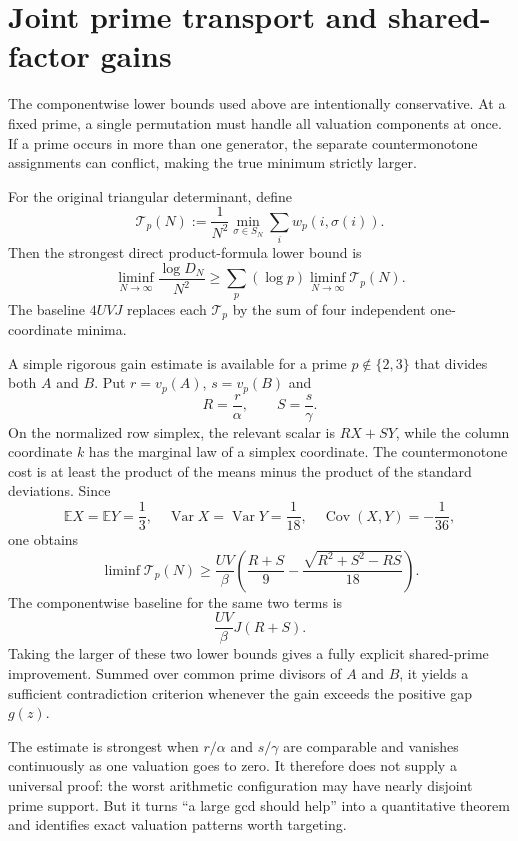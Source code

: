 \documentclass[11pt,oneside]{article}
\theoremstyle{definition}
\theoremstyle{remark}
\newcommand{\E}{\mathbb E}
\newcommand{\Var}{\operatorname{Var}}
\newcommand{\Cov}{\operatorname{Cov}}
\begin{document}
\section{Joint prime transport and shared-factor gains}

The componentwise lower bounds used above are intentionally conservative.  At
a fixed prime, a single permutation must handle all valuation components at
once.  If a prime occurs in more than one generator, the separate
countermonotone assignments can conflict, making the true minimum strictly
larger.

For the original triangular determinant, define
\[
 \mathcal T_p(N):=\frac1{N^2}
 \min_{\sigma\in S_N}\sum_i w_p(i,\sigma(i)).
\]
Then the strongest direct product-formula lower bound is
\[
 \liminf_{N\to\infty}\frac{\log D_N}{N^2}
 \ge\sum_p(\log p)\liminf_{N\to\infty}\mathcal T_p(N).
\]
The baseline $4UVJ$ replaces each $\mathcal T_p$ by the sum of four independent
one-coordinate minima.

A simple rigorous gain estimate is available for a prime $p\notin\{2,3\}$ that
divides both $A$ and $B$.  Put $r=v_p(A)$, $s=v_p(B)$ and
\[
 R=\frac r\alpha,\qquad S=\frac s\gamma.
\]
On the normalized row simplex, the relevant scalar is $RX+SY$, while the
column coordinate $k$ has the marginal law of a simplex coordinate.  The
countermonotone cost is at least the product of the means minus the product of
the standard deviations.  Since
\[
 \E X=\E Y=\frac13,\quad
 \Var X=\Var Y=\frac1{18},\quad
 \Cov(X,Y)=-\frac1{36},
\]
one obtains
\begin{equation}\label{eq:overlap-bound}
 \liminf\mathcal T_p(N)
 \ge\frac{UV}{\beta}
 \left(
  \frac{R+S}{9}
  -\frac{\sqrt{R^2+S^2-RS}}{18}
 \right).
\end{equation}
The componentwise baseline for the same two terms is
\[
 \frac{UV}{\beta}J(R+S).
\]
Taking the larger of these two lower bounds gives a fully explicit shared-prime
improvement.  Summed over common prime divisors of $A$ and $B$, it yields a
sufficient contradiction criterion whenever the gain exceeds the positive
gap $g(z)$.

The estimate is strongest when $r/\alpha$ and $s/\gamma$ are comparable and
vanishes continuously as one valuation goes to zero.  It therefore does not
supply a universal proof: the worst arithmetic configuration may have nearly
disjoint prime support.  But it turns ``a large gcd should help'' into a
quantitative theorem and identifies exact valuation patterns worth targeting.
\end{document}
